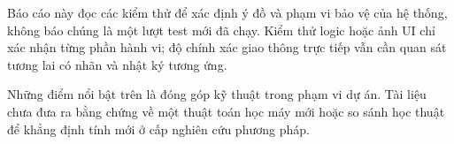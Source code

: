     Báo cáo này đọc các kiểm thử để xác định ý đồ và phạm vi bảo vệ của hệ thống, không báo chúng là một lượt test mới đã chạy. Kiểm thử logic hoặc ảnh UI chỉ xác nhận từng phần hành vi; độ chính xác giao thông trực tiếp vẫn cần quan sát tương lai có nhãn và nhật ký tương ứng.

    Những điểm nổi bật trên là đóng góp kỹ thuật trong phạm vi dự án. Tài liệu chưa đưa ra bằng chứng về một thuật toán học máy mới hoặc so sánh học thuật để khẳng định tính mới ở cấp nghiên cứu phương pháp.

